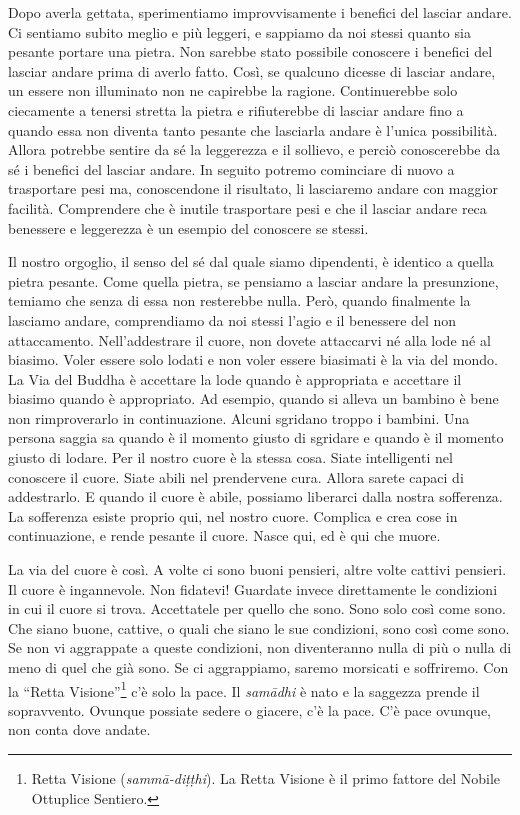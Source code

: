 Dopo averla gettata, sperimentiamo improvvisamente i benefici del
lasciar andare. Ci sentiamo subito meglio e più leggeri, e sappiamo da
noi stessi quanto sia pesante portare una pietra. Non sarebbe stato
possibile conoscere i benefici del lasciar andare prima di averlo fatto.
Così, se qualcuno dicesse di lasciar andare, un essere non illuminato
non ne capirebbe la ragione. Continuerebbe solo ciecamente a tenersi
stretta la pietra e rifiuterebbe di lasciar andare fino a quando essa
non diventa tanto pesante che lasciarla andare è l'unica possibilità.
Allora potrebbe sentire da sé la leggerezza e il sollievo, e perciò
conoscerebbe da sé i benefici del lasciar andare. In seguito potremo
cominciare di nuovo a trasportare pesi ma, conoscendone il risultato, li
lasciaremo andare con maggior facilità. Comprendere che è inutile
trasportare pesi e che il lasciar andare reca benessere e leggerezza è
un esempio del conoscere se stessi.

Il nostro orgoglio, il senso del sé dal quale siamo dipendenti, è
identico a quella pietra pesante. Come quella pietra, se pensiamo a
lasciar andare la presunzione, temiamo che senza di essa non resterebbe
nulla. Però, quando finalmente la lasciamo andare, comprendiamo da noi
stessi l'agio e il benessere del non attaccamento. Nell'addestrare il
cuore, non dovete attaccarvi né alla lode né al biasimo. Voler essere
solo lodati e non voler essere biasimati è la via del mondo. La Via del
Buddha è accettare la lode quando è appropriata e accettare il biasimo
quando è appropriato. Ad esempio, quando si alleva un bambino è bene non
rimproverarlo in continuazione. Alcuni sgridano troppo i bambini. Una
persona saggia sa quando è il momento giusto di sgridare e quando è il
momento giusto di lodare. Per il nostro cuore è la stessa cosa. Siate
intelligenti nel conoscere il cuore. Siate abili nel prendervene cura.
Allora sarete capaci di addestrarlo. E quando il cuore è abile, possiamo
liberarci dalla nostra sofferenza. La sofferenza esiste proprio qui, nel
nostro cuore. Complica e crea cose in continuazione, e rende pesante il
cuore. Nasce qui, ed è qui che muore.

La via del cuore è così. A volte ci sono buoni pensieri, altre volte
cattivi pensieri. Il cuore è ingannevole. Non fidatevi! Guardate invece
direttamente le condizioni in cui il cuore si trova. Accettatele per
quello che sono. Sono solo così come sono. Che siano buone, cattive, o
quali che siano le sue condizioni, sono così come sono. Se non vi
aggrappate a queste condizioni, non diventeranno nulla di più o nulla di
meno di quel che già sono. Se ci aggrappiamo, saremo morsicati e
soffriremo. Con la ``Retta Visione''\footnote{Retta Visione
  (\emph{sammā-diṭṭhi}). La Retta Visione è il primo fattore del Nobile
  Ottuplice Sentiero.} c'è solo la pace. Il \emph{samādhi} è nato e la
saggezza prende il sopravvento. Ovunque possiate sedere o giacere, c'è
la pace. C'è pace ovunque, non conta dove andate.

